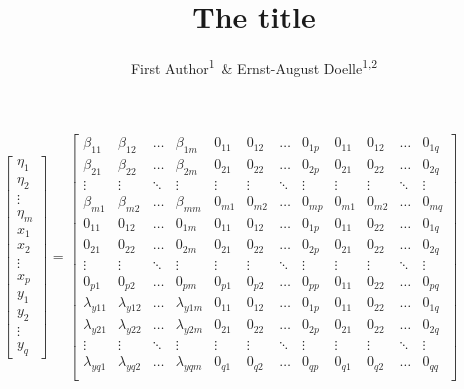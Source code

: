 \documentclass[man]{apa6}
\title{The title}
\author{First Author\textsuperscript{1}~\& Ernst-August Doelle\textsuperscript{1,2}}
\affiliation{
    \vspace{0.5cm}
          \textsuperscript{1} Wilhelm-Wundt-University\\
          \textsuperscript{2} Konstanz Business School  }
\theoremstyle{definition}
\theoremstyle{definition}
\theoremstyle{definition}
\theoremstyle{remark}
\begin{document}
\maketitle

\setcounter{secnumdepth}{0}



\setcounter{MaxMatrixCols}{20}

\(\begin{bmatrix}  \eta_{1} \\  \eta_{2} \\  \vdots \\  \eta_{m} \\  x_{1} \\  x_{2} \\  \vdots \\  x_{p} \\  y_{1} \\  y_{2} \\  \vdots \\  y_{q} \end{bmatrix}\)
=
\(\begin{bmatrix}  \beta_{11} & \beta_{12} & \dots & \beta_{1m} & 0_{11} & 0_{12} & \dots & 0_{1p} & 0_{11} & 0_{12} & \dots & 0_{1q} \\  \beta_{21} & \beta_{22} & \dots & \beta_{2m} & 0_{21} & 0_{22} & \dots & 0_{2p} & 0_{21} & 0_{22} & \dots & 0_{2q} \\  \vdots & \vdots & \ddots & \vdots & \vdots & \vdots & \ddots & \vdots &\vdots &\vdots & \ddots & \vdots \\  \beta_{m1} & \beta_{m2} & \dots & \beta_{mm} & 0_{m1} & 0_{m2} & \dots & 0_{mp} & 0_{m1} & 0_{m2} & \dots & 0_{mq} \\  0_{11} & 0_{12} & \dots & 0_{1m} & 0_{11} & 0_{12} & \dots & 0_{1p} & 0_{11} & 0_{22} & \dots & 0_{1q} \\  0_{21} & 0_{22} & \dots & 0_{2m} & 0_{21} & 0_{22} & \dots & 0_{2p} & 0_{21} & 0_{22} & \dots & 0_{2q} \\  \vdots & \vdots & \ddots & \vdots & \vdots & \vdots & \ddots & \vdots &\vdots &\vdots & \ddots & \vdots \\  0_{p1} & 0_{p2} & \dots & 0_{pm} & 0_{p1} & 0_{p2} & \dots & 0_{pp} & 0_{11} & 0_{22} & \dots & 0_{pq} \\  \lambda_{y11} & \lambda_{y12} & \dots & \lambda_{y1m} & 0_{11} & 0_{12} & \dots & 0_{1p} & 0_{11} & 0_{22} & \dots & 0_{1q} \\  \lambda_{y21} & \lambda_{y22} & \dots & \lambda_{y2m} & 0_{21} & 0_{22} & \dots & 0_{2p} & 0_{21} & 0_{22} & \dots & 0_{2q} \\  \vdots & \vdots & \ddots & \vdots & \vdots & \vdots & \ddots & \vdots &\vdots &\vdots & \ddots & \vdots \\  \lambda_{yq1} & \lambda_{yq2} & \dots & \lambda_{yqm} & 0_{q1} & 0_{q2} & \dots & 0_{qp} & 0_{q1} & 0_{q2} & \dots & 0_{qq} \\ \end{bmatrix}\)
\end{document}

